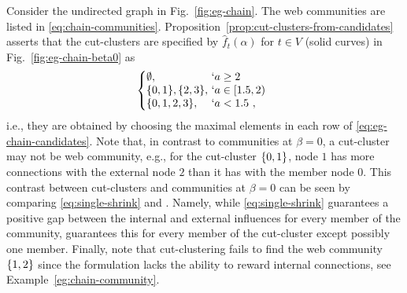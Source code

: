 \begin{example}
	\label{eg:chain-cut}
	Consider the undirected graph in Fig.~\ref{fig:eg-chain}.
	The web communities are listed in \eqref{eq:chain-communities}.
%
	Proposition~\ref{prop:cut-clusters-from-candidates} asserts that the cut-clusters are specified
	by $\hat{f}_{t}(\alpha)$ for $t\in V$ (solid curves) in Fig.~\ref{fig:eg-chain-beta0} as
	\begin{align}
			\label{eq:eg-chain-cut}
			\left\{
				\!\!\!
				\begin{array}{l@{\ }l}
					\emptyset, & `a \geq 2  
					\\
					\Set{0,1}, \Set{2,3}, & `a \in [1.5, 2)
					\\
					\Set{0,1,2,3}, &  `a < 1.5 \ ,
				\end{array}
			\right.
	\end{align}
	i.e., they are obtained by choosing the maximal elements in each row of \eqref{eq:eg-chain-candidates}.
	Note that, in contrast to communities at $\beta = 0$, a cut-cluster may 
	not be web community, e.g., for the cut-cluster $\{0,1\}$, node $1$  has more
	connections with the external node $2$ than it has with the member node $0$.
	This contrast between cut-clusters and communities at $\beta = 0$
	can be seen by comparing \eqref{eq:single-shrink} and \cite[Lemma~3.1]{flake:cut-clustering}.
	Namely, while \eqref{eq:single-shrink} guarantees a positive gap between the internal and external
	influences for every member of the community, \cite[Lemma~3.1]{flake:cut-clustering} guarantees this
	for every member of the cut-cluster except possibly one member. 
	Finally, note that cut-clustering fails to find the web community $\{1,2\}$ since the formulation
	lacks the ability to reward internal connections, see Example~\ref{eg:chain-community}.
\end{example}

